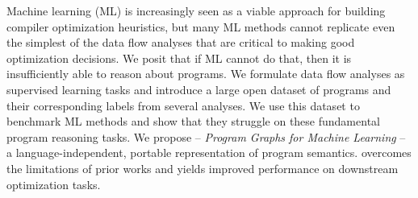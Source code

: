 Machine learning (ML) is increasingly seen as a viable approach for building
compiler optimization heuristics, but many ML methods cannot replicate even the
simplest of the data flow analyses that are critical to making good optimization
decisions. We posit that if ML cannot do that, then it is insufficiently able to
reason about programs. We formulate data flow analyses as supervised learning
tasks and introduce a large open dataset of programs and their corresponding
labels from several analyses. We use this dataset to benchmark ML methods and
show that they struggle on these fundamental program reasoning tasks. We propose
\programl{} -- \emph{Program Graphs for Machine Learning} -- a
language-independent, portable representation of program semantics. \programl
overcomes the limitations of prior works and yields improved performance on
downstream optimization tasks.
